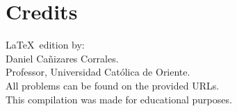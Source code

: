 \documentclass[12pt,a4paper,oneside]{article}
\begin{document}






\newpage
\section*{Credits}
\LaTeX \ edition by: \\

Daniel Ca\~nizares Corrales. \\
Professor, Universidad Cat\'olica de Oriente. \\

All problems can be found on the provided URLs. \\
This compilation was made for educational purposes.
\end{document}
